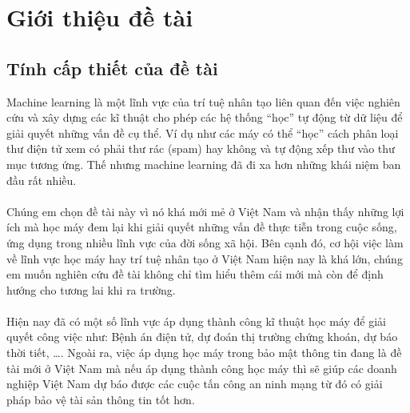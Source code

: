 \chapter{Giới thiệu đề tài}
\section{Tính cấp thiết của đề tài}
Machine learning là một lĩnh vực của trí tuệ nhân tạo liên quan đến việc nghiên
cứu và xây dựng các kĩ thuật cho phép các hệ thống “học” tự động từ dữ liệu để
giải quyết những vấn đề cụ thể. Ví dụ như các máy có thể “học” cách phân loại
thư điện tử xem có phải thư rác (spam) hay không và tự động xếp thư vào thư mục
tương ứng. Thế nhưng machine learning đã đi xa hơn những khái niệm ban đầu rất
nhiều.\\\\ 
Chúng em chọn đề tài này vì nó khá mới mẻ ở Việt Nam và nhận
thấy những lợi ích mà học máy đem lại khi giải quyết những vấn đề thực tiễn
trong cuộc sống, ứng dụng trong nhiều lĩnh vực của đời sống xã hội. Bên cạnh đó,
cơ hội việc làm về lĩnh vực học máy hay trí tuệ nhân tạo ở Việt Nam hiện nay là
khá lớn, chúng em muốn nghiên cứu đề tài không chỉ tìm hiểu thêm cái mới mà còn
để định hướng cho tương lai khi ra trường.\\\\ 
Hiện nay đã có một số lĩnh
vực áp dụng thành công kĩ thuật học máy để giải quyết công việc như: Bệnh án
điện tử, dự đoán thị trường chứng khoán, dự báo thời tiết, \dots. Ngoài ra, việc
áp dụng học máy trong bảo mật thông tin đang là đề tài mới ở Việt Nam mà nếu áp
dụng thành công học máy thì sẽ giúp các doanh nghiệp Việt Nam dự báo được các
cuộc tấn công an ninh mạng từ đó có giải pháp bảo vệ tài sản thông tin tốt hơn.
